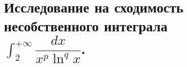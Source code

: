 \documentclass[../main.tex]{subfiles}
\begin{document}
\newpage
\section{Исследование на сходимость несобственного интеграла \( \int_{ 2}^{ + \infty } \dfrac{ dx}{ x^p\ln^qx}\).}
\end{document}
